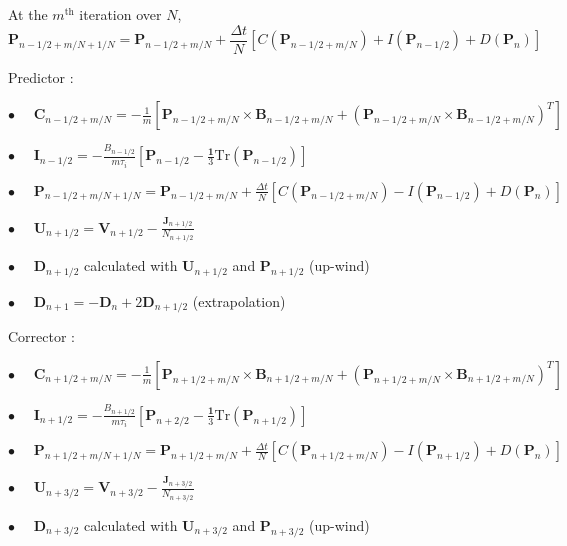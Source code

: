 \documentclass[a4paper,11pt]{letter}
\begin{document}
\bigskip

At the $m^{\mathrm{th}}$ iteration over $N$,
$$
\mathbf P_{n-1/2+m/N+1/N} = \mathbf P_{n-1/2+m/N} + \frac{\Delta t}{N} [C(\mathbf P_{n-1/2+m/N}) + I(\mathbf P_{n-1/2}) + D (\mathbf P_n)]
$$

\newpage

Predictor :

$\displaystyle \bullet \,\,\,\,\,\,\,\, \mathbf C_{n-1/2+m/N} = -\frac{1}{m} \left[\mathbf P_{n-1/2+m/N} \times \mathbf B_{n-1/2+m/N} + \left(\mathbf P_{n-1/2+m/N} \times \mathbf B_{n-1/2+m/N}\right)^T\right]$

$\displaystyle \bullet \,\,\,\,\,\,\,\, \mathbf I_{n-1/2} = -\frac{B_{n-1/2}}{m \tau_i} \left[ \mathbf P_{n-1/2} - \frac{\mathbf 1}{3} \mathrm{Tr} (\mathbf P_{n-1/2}) \right]$

$\displaystyle \bullet \,\,\,\,\,\,\,\, \mathbf P_{n-1/2+m/N+1/N} = \mathbf P_{n-1/2+m/N} + \frac{\Delta t}{N} [C(\mathbf P_{n-1/2+m/N}) - I(\mathbf P_{n-1/2}) + D (\mathbf P_n)]$

$\displaystyle \bullet \,\,\,\,\,\,\,\, \mathbf U_{n+1/2} = \mathbf V_{n+1/2} - \frac{\mathbf J_{n+1/2}}{N_{n+1/2}}$

$\displaystyle \bullet \,\,\,\,\,\,\,\, \mathbf D_{n+1/2}$ calculated with $\mathbf U_{n+1/2}$ and $\mathbf P_{n+1/2}$ (up-wind)

$\displaystyle \bullet \,\,\,\,\,\,\,\, \mathbf D_{n+1} = - \mathbf D_{n} + 2 \mathbf D_{n+1/2}$ (extrapolation)

\bigskip

Corrector :

$\displaystyle \bullet \,\,\,\,\,\,\,\, \mathbf C_{n+1/2+m/N} = -\frac{1}{m} \left[\mathbf P_{n+1/2+m/N} \times \mathbf B_{n+1/2+m/N} + \left(\mathbf P_{n+1/2+m/N} \times \mathbf B_{n+1/2+m/N}\right)^T\right]$

$\displaystyle \bullet \,\,\,\,\,\,\,\, \mathbf I_{n+1/2} = -\frac{B_{n+1/2}}{m \tau_i} \left[ \mathbf P_{n+2/2} - \frac{\mathbf 1}{3} \mathrm{Tr} (\mathbf P_{n+1/2}) \right]$

$\displaystyle \bullet \,\,\,\,\,\,\,\, \mathbf P_{n+1/2+m/N+1/N} = \mathbf P_{n+1/2+m/N} + \frac{\Delta t}{N} [C(\mathbf P_{n+1/2+m/N}) - I(\mathbf P_{n+1/2}) + D (\mathbf P_n)]$

$\displaystyle \bullet \,\,\,\,\,\,\,\, \mathbf U_{n+3/2} = \mathbf V_{n+3/2} - \frac{\mathbf J_{n+3/2}}{N_{n+3/2}}$

$\displaystyle \bullet \,\,\,\,\,\,\,\, \mathbf D_{n+3/2}$ calculated with $\mathbf U_{n+3/2}$ and $\mathbf P_{n+3/2}$ (up-wind)
\end{document}
